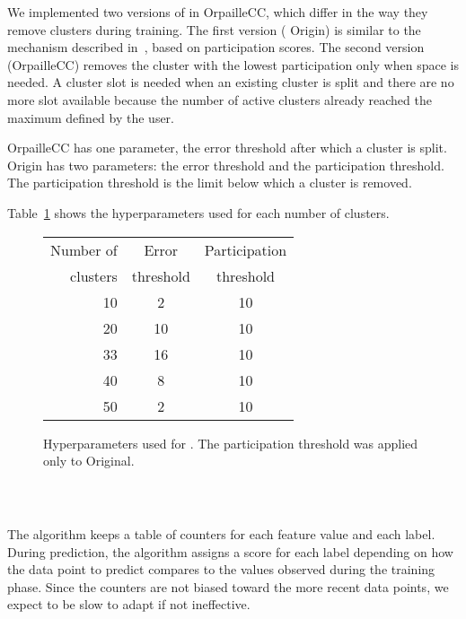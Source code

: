 We implemented two versions of \mcnn in
OrpailleCC, which differ in the way they remove
clusters during training. The first version (\mcnn
Origin) is similar to the mechanism described
in~\cite{mc-nn}, based on participation scores.
The second version (\mcnn OrpailleCC)
removes the cluster with the lowest participation
only when space is needed.  A cluster slot is
needed when an existing cluster is split and there
are no more slot available because the number of
active clusters already reached the maximum defined
by the user.

\mcnn OrpailleCC has one
parameter, the error threshold after which a
cluster is split.  \mcnn Origin has two
parameters: the error threshold and the
participation threshold. The participation
threshold is the limit below which a cluster is
removed.

Table~\ref{table:hyperparameter-mcnn} shows
the hyperparameters used for each number of
clusters. 
\begin{figure}
		\begin{center}
			\begin{tabular}{|| r | c | c ||} 
				\hline
					Number of &  Error & Participation\\ [0.5ex] 
					clusters & threshold & threshold\\[0.5ex]
				\hline\hline
					10 & 2 & 10\\
					20 & 10 & 10\\
					33 & 16 & 10\\
					40 & 8 & 10\\
					50 & 2 & 10\\
				\hline
			\end{tabular}
		\end{center}
		\caption{Hyperparameters used for \mcnn. The
		participation threshold was applied only to
		\mcnn Original.}
		\label{table:hyperparameter-mcnn}
\end{figure}

\subsubsection{\naivebayes~\cite{naive_bayes}}
The \naivebayes algorithm keeps a table of
counters for each feature value and each label.
During prediction, the algorithm assigns a
score for each label depending on how the data
point to predict compares to the values observed
during the training phase. Since the counters are
not biased toward the more recent data points, we
expect \naivebayes to be slow to adapt if not
ineffective.

